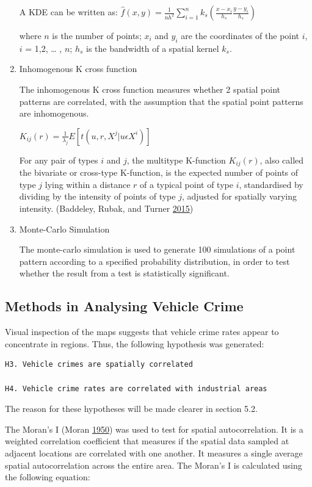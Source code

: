 \documentclass[]{article}
\theoremstyle{definition}
\theoremstyle{definition}
\theoremstyle{definition}
\theoremstyle{remark}
\begin{document}
\begin{enumerate}
  A KDE can be written as:
  \(\hat{f}(x,y)=\frac{1}{nh^2}\sum_{i=1}^nk_s(\frac{x-x_i}{h_s}\frac{y-y_i}{h_s})\)

  where \(n\) is the number of points; \(x_{i}\) and \(y_{i}\) are the
  coordinates of the point \(i\), \(i\) = 1,2, \ldots{} , \(n\);
  \(h_{s}\) is the bandwidth of a spatial kernel \(k_{s}\).
\item
  Inhomogenous K cross function

  The inhomogenous K cross function measures whether 2 spatial point
  patterns are correlated, with the assumption that the spatial point
  patterns are inhomogenous.

  \(K_{ij}(r) = \frac{1}{\lambda_{j}}E[t(u,r,X^{j} | u \epsilon X^{i} )]\)

  For any pair of types \(i\) and \(j\), the multitype K-function
  \(K_{ij}(r)\), also called the bivariate or cross-type K-function, is
  the expected number of points of type \(j\) lying within a distance
  \(r\) of a typical point of type \(i\), standardised by dividing by
  the intensity of points of type \(j\), adjusted for spatially varying
  intensity. (Baddeley, Rubak, and Turner
  \protect\hyperlink{ref-Baddeley2016}{2015})
\item
  Monte-Carlo Simulation

  The monte-carlo simulation is used to generate 100 simulations of a
  point pattern according to a specified probability distribution, in
  order to test whether the result from a test is statistically
  significant.
\end{enumerate}

\subsection{Methods in Analysing Vehicle
Crime}\label{methods-in-analysing-vehicle-crime}

Visual inspection of the maps suggests that vehicle crime rates appear
to concentrate in regions. Thus, the following hypothesis was generated:

\begin{verbatim}
H3. Vehicle crimes are spatially correlated

H4. Vehicle crime rates are correlated with industrial areas
\end{verbatim}

The reason for these hypotheses will be made clearer in section 5.2.

The Moran's I (Moran \protect\hyperlink{ref-Moran1950}{1950}) was used
to test for spatial autocorrelation. It is a weighted correlation
coefficient that measures if the spatial data sampled at adjacent
locations are correlated with one another. It measures a single average
spatial autocorrelation across the entire area. The Moran's I is
calculated using the following equation:
\end{document}

